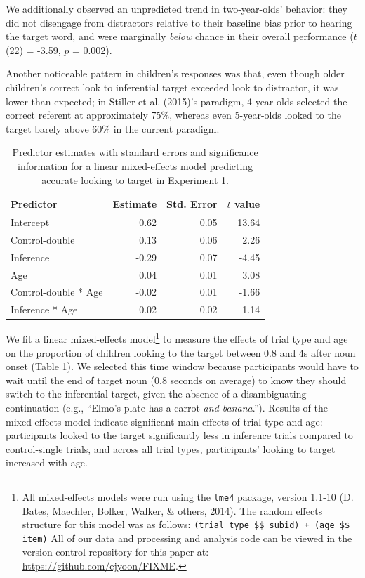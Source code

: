\documentclass[a4paper,man,apacite,floatsintext]{apa6}
\begin{document}
We additionally observed an unpredicted trend in two-year-olds'
behavior: they did not disengage from distractors relative to their
baseline bias prior to hearing the target word, and were marginally
\emph{below} chance in their overall performance (\(t\)(22) = -3.59,
\(p\) = 0.002).

Another noticeable pattern in children's responses was that, even though
older children's correct look to inferential target exceeded look to
distractor, it was lower than expected; in Stiller et al. (2015)'s
paradigm, 4-year-olds selected the correct referent at approximately
75\%, whereas even 5-year-olds looked to the target barely above 60\% in
the current paradigm.

\begin{table}[tb]
\centering
\begin{tabular}{lrrr}
 Predictor & Estimate & Std. Error & $t$ value \\ 
  \hline
Intercept & 0.62 & 0.05 & 13.64 \\ 
  Control-double & 0.13 & 0.06 & 2.26 \\ 
  Inference & -0.29 & 0.07 & -4.45 \\ 
  Age & 0.04 & 0.01 & 3.08 \\ 
  Control-double * Age & -0.02 & 0.01 & -1.66 \\ 
  Inference * Age & 0.02 & 0.02 & 1.14 \\ 
   \hline
\end{tabular}
\caption{Predictor estimates with standard errors and significance information for a linear mixed-effects model predicting accurate looking to target in Experiment 1.} 
\label{tab:exp1_tab}
\end{table}

We fit a linear mixed-effects model\footnote{All mixed-effects models
  were run using the \texttt{lme4} package, version 1.1-10 (D. Bates,
  Maechler, Bolker, Walker, \& others, 2014). The random effects
  structure for this model was as follows:
  \texttt{(trial type \$\textbar{}\$ subid) + (age \$\textbar{}\$ item)}
  All of our data and processing and analysis code can be viewed in the
  version control repository for this paper at:
  \url{https://github.com/ejyoon/FIXME}.} to measure the effects of
trial type and age on the proportion of children looking to the target
between 0.8 and 4s after noun onset (Table 1). We selected this time
window because participants would have to wait until the end of target
noun (0.8 seconds on average) to know they should switch to the
inferential target, given the absence of a disambiguating continuation
(e.g., ``Elmo's plate has a carrot \emph{and banana}.''). Results of the
mixed-effects model indicate significant main effects of trial type and
age: participants looked to the target significantly less in inference
trials compared to control-single trials, and across all trial types,
participants' looking to target increased with age.
\end{document}

